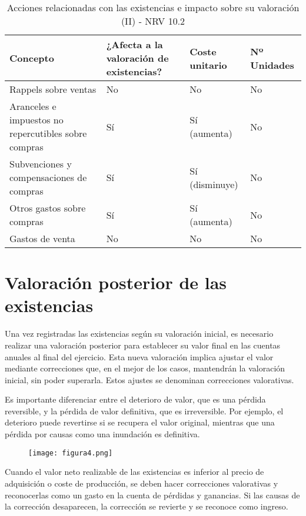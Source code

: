 \documentclass{article}
\begin{document}
    \begin{table}[H]
    \centering
    \begin{tabular}{|p{3cm}|p{3cm}|p{3cm}|p{3cm}|}
    \hline
    \textbf{Concepto} & \textbf{¿Afecta a la valoración de existencias?} & \textbf{Coste unitario} & \textbf{Nº Unidades} \\
    \hline
    Rappels sobre ventas & No & No & No \\
    \hline
    Aranceles e impuestos no repercutibles sobre compras & Sí & Sí (aumenta) & No \\
    \hline
    Subvenciones y compensaciones de compras & Sí & Sí (disminuye) & No \\
    \hline
    Otros gastos sobre compras & Sí & Sí (aumenta) & No \\
    \hline
    Gastos de venta & No & No & No \\
    \hline
    \end{tabular}
    \caption{Acciones relacionadas con las existencias e impacto sobre su valoración (II) - NRV 10.2}
    \end{table}

    \section{Valoración posterior de las existencias}


Una vez registradas las existencias según su valoración inicial, es necesario realizar una valoración posterior para establecer su valor final en las cuentas anuales al final del ejercicio. Esta nueva valoración implica ajustar el valor mediante correcciones que, en el mejor de los casos, mantendrán la valoración inicial, sin poder superarla. Estos ajustes se denominan correcciones valorativas.

Es importante diferenciar entre el deterioro de valor, que es una pérdida reversible, y la pérdida de valor definitiva, que es irreversible. Por ejemplo, el deterioro puede revertirse si se recupera el valor original, mientras que una pérdida por causas como una inundación es definitiva.
\begin{figure}[H]
    \centering
    \texttt{[image: figura4.png]}
\end{figure}

Cuando el valor neto realizable de las existencias es inferior al precio de adquisición o coste de producción, se deben hacer correcciones valorativas y reconocerlas como un gasto en la cuenta de pérdidas y ganancias. Si las causas de la corrección desaparecen, la corrección se revierte y se reconoce como ingreso.
\end{document}
